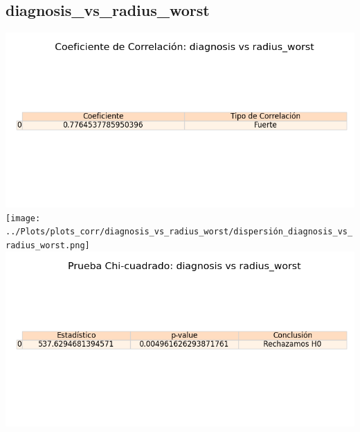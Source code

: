 \documentclass[a4paper, 12pt]{article}
\begin{document}
\subsection{diagnosis\_vs\_radius\_worst}
    \includegraphics[width = \textwidth]{../Plots/plots_corr/diagnosis_vs_radius_worst/coeficiente_correlacion_diagnosis_vs_radius_worst.png}
    \texttt{[image: ../Plots/plots\_corr/diagnosis\_vs\_radius\_worst/dispersión\_diagnosis\_vs\_radius\_worst.png]}
    \includegraphics[width = \textwidth]{../Plots/plots_corr/diagnosis_vs_radius_worst/chi_cuadrado_diagnosis_vs_radius_worst.png}
\end{document}

